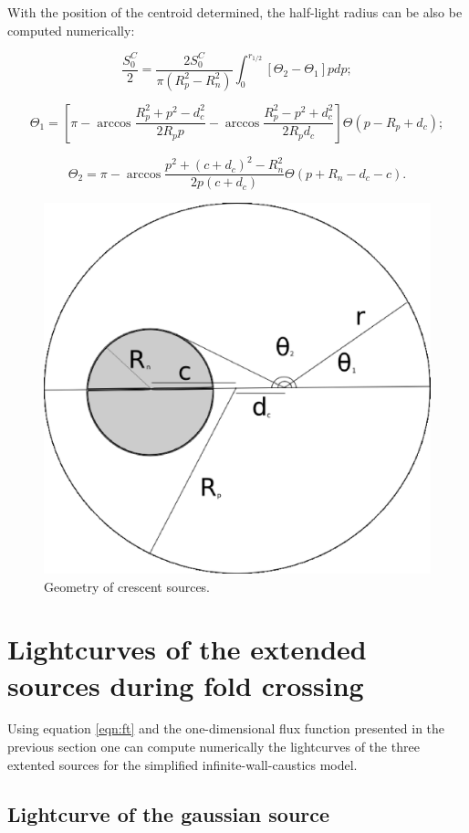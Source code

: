 With the position of the centroid determined, the half-light radius can be also be computed numerically:
 
\begin{equation}
\frac{S_0^C}{2} =  \frac{2 S_0^C}{\pi \left(R_p^2-R_n^2 \right)} \int_{0}^{r_{1/2}} \left[ \Theta_2  - \Theta_1  \right] p dp;
\end{equation}

\begin{equation}
\Theta_1 = \left[ \pi - \arccos \frac{R_p^2 + p^2 -d_c^2}{2 R_p p} - \arccos \frac{R_p^2 - p^2 + d_c^2}{2 R_p d_c} \right] \Theta \left( p - R_p + d_c \right); 
\end{equation}

\begin{equation}
\Theta_2 =  \pi - \arccos \frac{ p^2  + (c+d_c)^2 - R_n^2}{2 p \left(c + d_c \right)} \Theta \left( p + R_n - d_c -c \right). 
\end{equation}

\begin{figure}
\includegraphics[width = .49\textwidth]{plots/figure_rhalf.eps}
\caption{\label{fig:geom_crescent} Geometry of crescent sources.}
\end{figure}





\section{Lightcurves of the extended sources during fold crossing}

Using equation \ref{eqn:ft} and the one-dimensional flux function presented in the previous section one can compute numerically the lightcurves of the three extented sources for the simplified 
infinite-wall-caustics model.

\subsection{Lightcurve of the gaussian source}

